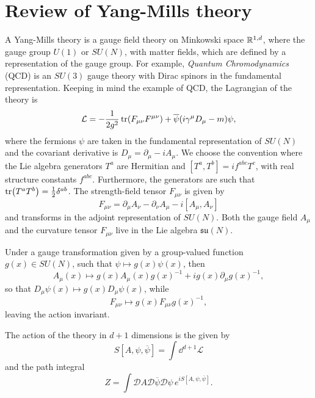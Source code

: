 \section{Review of Yang-Mills theory}
\label{sec:yang_mills_theory}

A Yang-Mills theory is a gauge field theory on Minkowski space $\mathbb{R}^{1,d}$, where the gauge group $U(1)$ or $SU(N)$, with matter fields, which are defined by a representation of the gauge group.
For example, \emph{Quantum Chromodynamics} (QCD) is an $SU(3)$ gauge theory with Dirac spinors in the fundamental representation.
Keeping in mind the example of QCD, the Lagrangian of the theory is
\begin{equation}
    \mathcal{L} = - \frac{1}{2 g^2} \tr(F_{\mu \nu} F^{\mu \nu}) + \overline{\psi} \qty( i \gamma^{\mu} D_{\mu} - m ) \psi,
\end{equation}
where the fermions $\psi$ are taken in the fundamental representation of $SU(N)$ and the covariant derivative is $D_{\mu} = \partial_{\mu} - i A_{\mu}$.
We choose the convention where the Lie algebra generators $T^a$ are Hermitian and $[T^a, T^b] = i f^{abc} T^c$, with real structure constants $f^{abc}$.
Furthermore, the generators are such that $\tr(T^a T^b) = \frac{1}{2} \delta^{ab}$.
The strength-field tensor $F_{\mu \nu}$ is given by
\begin{equation}
    F_{\mu \nu} = \partial_{\mu} A_{\nu} - \partial_{\nu} A_{\mu} - i [A_{\mu}, A_{\nu}]
\end{equation}
and transforms in the adjoint representation of $SU(N)$.
Both the gauge field $A_{\mu}$ and the curvature tensor $F_{\mu \nu}$ live in the Lie algebra $\mathfrak{su}(N)$.

Under a gauge transformation given by a group-valued function $g(x) \in SU(N)$, such that $\psi \mapsto g(x) \psi(x)$, then
\begin{equation}
    A_{\mu}(x) \mapsto g(x) A_{\mu}(x) g(x)^{-1} + i g(x) \partial_{\mu} g(x)^{-1},
\end{equation}
so that $D_{\mu} \psi(x) \mapsto g(x) D_{\mu} \psi(x)$, while
\begin{equation}
    F_{\mu \nu} \mapsto g(x) F_{\mu \nu} g(x)^{-1},
\end{equation}
leaving the action invariant.

The action of the theory in $d+1$ dimensions is the given by
\begin{equation}
    S[A, \psi, \overline{\psi}] = \int \dd^{d+1} \mathcal{L}
\end{equation}
and the path integral
\begin{equation}
    Z = \int \mathcal{D} A \mathcal{D} \overline{\psi} \mathcal{D} \psi \, e^{i S[A, \psi, \overline{\psi}]}.
\end{equation}


